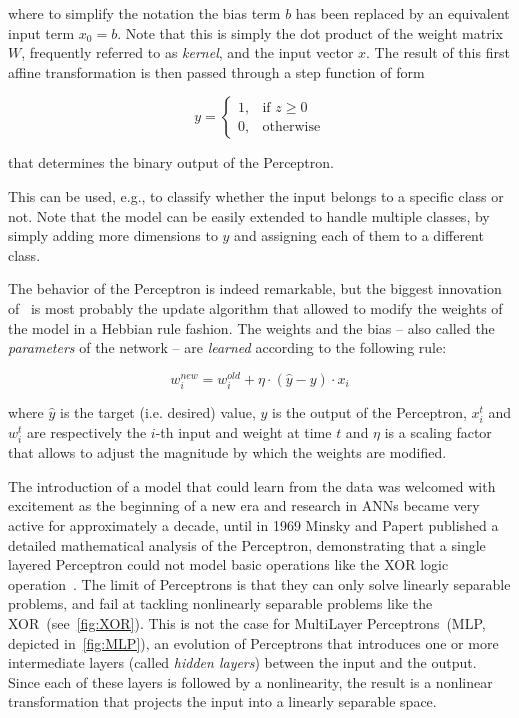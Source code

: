 \noindent where to simplify the notation the bias term $b$ has been replaced
by an equivalent input term $x_0=b$. Note that this is simply the dot
product of the weight matrix $W$, frequently referred to as \emph{kernel}, and
the input vector $x$. The result of this first affine transformation is then
passed through a step function of form

\begin{equation*}
    y =
        \begin{cases}
            1,          & \text{if } z \geq 0 \\
            0,         & \text{otherwise}
        \end{cases}
\end{equation*}

\noindent that determines the binary output of the Perceptron.

This can be used, e.g., to classify whether the input belongs to a specific
class or not. Note that the model can be easily extended to handle multiple
classes, by simply adding more dimensions to $y$ and assigning each of them to
a different class.

The behavior of the Perceptron is indeed remarkable, but the biggest innovation
of~\cite{Rosenblatt57} is most probably the update algorithm that allowed to
modify the weights of the model in a Hebbian rule fashion. The weights and the
bias -- also called the \emph{parameters} of the network -- are \emph{learned}
according to the following rule:

\begin{equation}\label{eq:perceptron_lr}
    w_i^{new} = w_i^{old} + \eta \cdot (\hat y - y) \cdot x_i
\end{equation}

\noindent where $\hat y$ is the target (i.e. desired) value, $y$ is the output
of the Perceptron, $x_i^t$ and $w_i^t$ are respectively the $i$-th input and
weight at time $t$ and $\eta$ is a scaling factor that allows to
adjust the magnitude by which the weights are modified.

The introduction of a model that could learn from the data
was welcomed with excitement as the beginning of a new era and
research in ANNs became very active for approximately a decade, until in
1969 Minsky and Papert published a detailed mathematical analysis of the
Perceptron, demonstrating that a single layered Perceptron could not model
basic operations like the XOR logic operation~\citep{Minsky69}. The limit of
Perceptrons is that they can only solve linearly separable problems, and fail
at tackling nonlinearly separable problems like the
XOR~(see~\autoref{fig:XOR}). This is not the case for MultiLayer
Perceptrons~(MLP, depicted in~\autoref{fig:MLP}), an evolution of Perceptrons
that introduces one or more intermediate layers (called \emph{hidden layers})
between the input and the output. Since each of these layers is followed by a
nonlinearity, the result is a nonlinear transformation that projects the input
into a linearly separable space.


